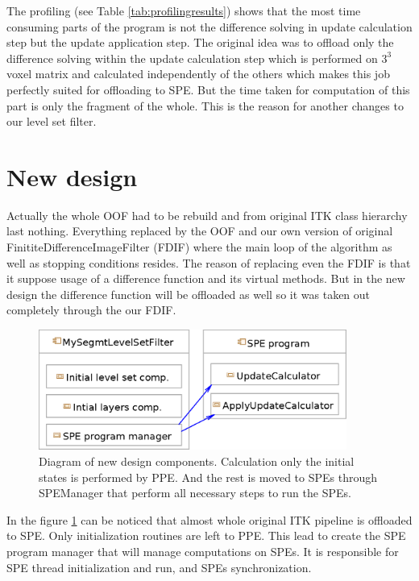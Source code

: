 \par
The profiling (see Table \ref{tab:profilingresults}) shows that the most time consuming parts of the program is not the difference solving in update calculation step but the update application step.
The original idea was to offload only the difference solving within the update calculation step which is performed on $3^3$ voxel matrix and calculated independently of the others which makes this job perfectly suited for offloading to SPE.
But the time taken for computation of this part is only the fragment of the whole.
This is the reason for another changes to our level set filter.

\section{New design}

\par
Actually the whole OOF had to be rebuild and from original ITK class hierarchy last nothing.
Everything replaced by the OOF and our own version of original FinititeDifferenceImageFilter (FDIF) where the main loop of the algorithm as well as stopping conditions resides.
The reason of replacing even the FDIF is that it suppose usage of a difference function and its virtual methods.
But in the new design the difference function will be offloaded as well so it was taken out completely through the our FDIF.

\begin{figure}
    \centering
    \includegraphics[width=0.9\textwidth]{data/newDesign}
    \caption[Diagram of new design components]
{
Diagram of new design components. Calculation only the initial states is performed by PPE.
And the rest is moved to SPEs through SPEManager that perform all necessary steps to run the SPEs.
}
\label{fg:newDesign}
\end{figure}

In the figure \ref{fg:newDesign} can be noticed that almost whole original ITK pipeline is offloaded to SPE.
Only initialization routines are left to PPE. This lead to create the SPE program manager that will manage computations on SPEs.
It is responsible for SPE thread initialization and run, and SPEs synchronization.

